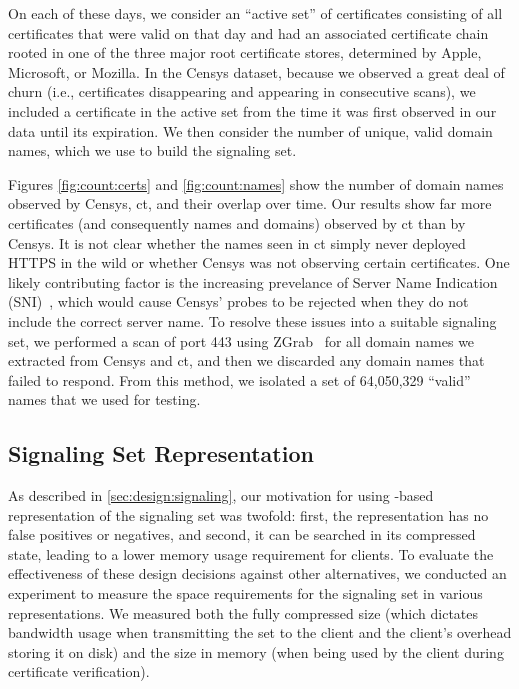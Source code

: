 On each of these days, we consider an ``active set'' of certificates consisting
of all certificates that were valid on that day and had an associated
certificate chain rooted in one of the three major root certificate stores,
determined by Apple, Microsoft, or Mozilla. In the Censys dataset, because we
observed a great deal of churn (i.e., certificates disappearing and appearing in
consecutive scans), we included a certificate in the active set from the
time it was first observed in our data until its expiration. We then consider
the number of unique, valid domain names, which we use to build the signaling
set.

Figures \autoref{fig:count:certs} and \autoref{fig:count:names} show the number of
domain names observed by Censys, \ac{ct}, and their overlap over time. Our results show 
far more certificates (and consequently names and domains) observed by
\ac{ct} than by Censys. It is not clear whether the names seen in \ac{ct} simply
never deployed HTTPS in the wild or whether Censys was not observing certain
certificates.  One likely contributing factor is the increasing prevelance of 
Server Name Indication (SNI)~\cite{rfc6066}, which would cause Censys' probes to be rejected
when they do not include the correct server name.
To resolve these issues into a suitable signaling set, we performed a scan of
port 443 using ZGrab~\cite{durumeric2015search} for all domain names we
extracted from Censys and \ac{ct}, and then we discarded any domain names that
failed to respond. From this method, we isolated a set of 64,050,329 ``valid''
names that we used for testing.

\subsection{Signaling Set Representation}
\label{sec:evaluation:implementation}

As described in \autoref{sec:design:signaling}, our motivation for using -based
representation of the signaling set was twofold: first, the representation has
no false positives or negatives, and second, it can be searched in its
compressed state, leading to a lower memory usage requirement for clients. To
evaluate the effectiveness of these design decisions against other alternatives,
we conducted an experiment to measure the space requirements for the signaling
set in various representations. 
We measured both the fully compressed size 
(which dictates bandwidth usage when transmitting
the set to the client and the client's overhead storing it on disk)
and the size in memory (when being used by the client during certificate verification).

